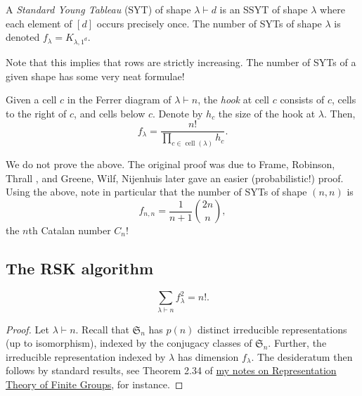 	\begin{fdef}
		A \emph{Standard Young Tableau} (SYT) of shape $\lambda\vdash d$ is an SSYT of shape $\lambda$ where each element of $[d]$ occurs precisely once. The number of SYTs of shape $\lambda$ is denoted $f_\lambda = K_{\lambda,1^d}$.
	\end{fdef}
	Note that this implies that rows are strictly increasing. The number of SYTs of a given shape has some very neat formulae!

	\begin{ftheo}
		Given a cell $c$ in the Ferrer diagram of $\lambda \vdash n$, the \emph{hook} at cell $c$ consists of $c$, cells to the right of $c$, and cells below $c$. Denote by $h_c$ the size of the hook at $\lambda$. Then,
		\[ f_\lambda = \frac{n!}{\prod_{c \in \operatorname{cell}(\lambda)} h_c}. \]
	\end{ftheo}
	We do not prove the above. The original proof was due to Frame, Robinson, Thrall \cite{frt-hook}, and Greene, Wilf, Nijenhuis \cite{grn-hook} later gave an easier (probabilistic!) proof.\\
	Using the above, note in particular that the number of SYTs of shape $(n,n)$ is
	\[ f_{n,n} = \frac{1}{n+1} \binom{2n}{n}, \]
	the $n$th Catalan number $C_n$!

\subsection{The RSK algorithm}

	\begin{ftheo}
		\[ \sum_{\lambda \vdash n} f_\lambda^2 = n!. \]
	\end{ftheo}
	\begin{proof}
		Let $\lambda \vdash n$. Recall that $\mathfrak{S}_n$ has $p(n)$ distinct irreducible representations (up to isomorphism), indexed by the conjugacy classes of $\mathfrak{S}_n$. Further, the irreducible representation indexed by $\lambda$ has dimension $f_\lambda$. The desideratum then follows by standard results, see Theorem 2.34 of \href{https://amitrajaraman.github.io/notes/rep-th/main.pdf}{my notes on Representation Theory of Finite Groups}, for instance.
	\end{proof}


